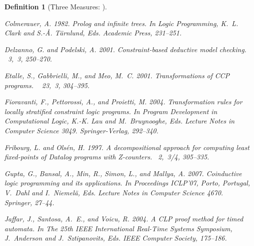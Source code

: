 \documentclass[english]{tlp}
\newtheorem{definition}{Definition} \newtheorem{example}{Example}       \newtheorem{remark}{Remark}
\begin{document}
\begin{definition}[Three Measures:   ]
{\begin{thebibliography}{}
{\sc Colmerauer, A.} 1982.
\newblock Prolog and infinite trees.
\newblock In {\em Logic Pro\-gramming}, {K.~L. Clark} {and} {S.-{\AA}.
  T{\"a}rnlund}, Eds. Academic Press, 231--251.

{\sc Delzanno, G.} {\sc and} {\sc Podelski, A.} 2001.
\newblock Constraint-based deductive model checking.
~{\em 3,\/}~3, 250--270.

{\sc Etalle, S.}, {\sc Gabbrielli, M.}, {\sc and} {\sc Meo, M.~C.} 2001.
\newblock Transformations of {CCP} programs.
~{\em
  23,\/}~3, 304--395.

{\sc Fioravanti, F.}, {\sc Pettorossi, A.}, {\sc and} {\sc Proietti, M.} 2004.
\newblock Transformation rules for locally stratified constraint logic
  programs.
\newblock In {\em Program Development in Computational Logic}, {K.-K. Lau}
  {and} {M.~Bruynooghe}, Eds. Lecture Notes in Computer Science 3049.
  Springer-Verlag, 292--340.

{\sc Fribourg, L.} {\sc and} {\sc Ols\'en, H.} 1997.
\newblock A decompositional approach for computing least fixed-points of
  {D}atalog programs with {Z}-counters.
~{\em 2,\/}~3/4, 305--335.

{\sc Gupta, G.}, {\sc Bansal, A.}, {\sc Min, R.}, {\sc Simon, L.}, {\sc and}
  {\sc Mallya, A.} 2007.
\newblock Coinductive logic programming and its applications.
\newblock In {\em Proceedings ICLP'07, Porto, Portugal}, {V.~Dahl} {and}
  {I.~Niemel{\"a}}, Eds. Lecture Notes in Computer Science 4670. Springer,
  27--44.

{\sc Jaffar, J.}, {\sc Santosa, A.~E.}, {\sc and} {\sc Voicu, R.} 2004.
\newblock A {CLP} proof method for timed automata.
\newblock In {\em The 25th IEEE International Real-Time Systems Symposium},
  {J.~Anderson} {and} {J.~Sztipanovits}, Eds. IEEE Computer Society, 175--186.


\end{thebibliography}}
\end{definition}
\end{document}
